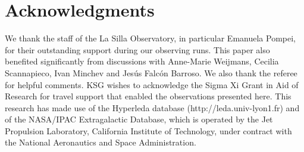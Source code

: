 \documentclass[useAMS,usenatbib]{mn2e}
\begin{document}
\section*{Acknowledgments}

We thank the staff of the La Silla Observatory, in particular Emanuela
Pompei, for their outstanding support during our observing runs.  This
paper also benefited significantly from discussions with Anne-Marie
Weijmans, Cecilia Scannapieco, Ivan Minchev and Jes\'us Falc\'on
Barroso.  We also thank the referee for helpful comments.  KSG wishes to
acknowledge the Sigma Xi Grant in Aid of Research for travel support
that enabled the observations presented here.  This research has made
use of the Hyperleda database (http://leda.univ-lyon1.fr) and of the
NASA/IPAC Extragalactic Database, which is operated by the Jet
Propulsion Laboratory, California Institute of Technology, under
contract with the National Aeronautics and Space Administration.





\label{lastpage}
\end{document}
